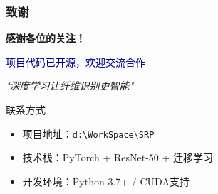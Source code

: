\documentclass[12pt]{beamer}
\begin{document}
\begin{frame}
\frametitle{致谢}
\begin{center}
\Large
\textbf{感谢各位的关注！}

\vspace{1cm}

\textcolor{darkblue}{项目代码已开源，欢迎交流合作}

\vspace{0.5cm}

\textit{"深度学习让纤维识别更智能"}
\end{center}

\vspace{1cm}

\begin{block}{联系方式}
\begin{itemize}
    \item 项目地址：\texttt{d:\textbackslash WorkSpace\textbackslash SRP}
    \item 技术栈：PyTorch + ResNet-50 + 迁移学习
    \item 开发环境：Python 3.7+ / CUDA支持
\end{itemize}
\end{block}
\end{frame}
\end{document}
